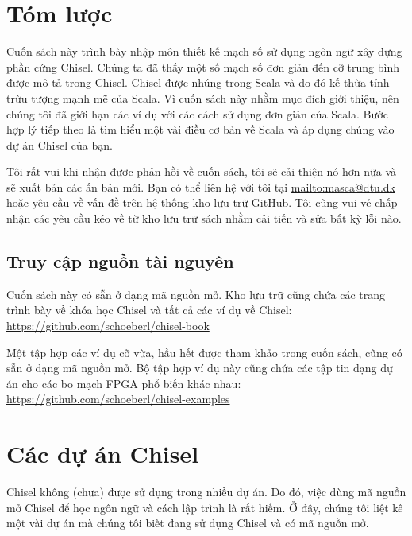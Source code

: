 \documentclass[%
    10pt,
    headinclude, footexclude,
    openright, %
    notitlepage,
    cleardoubleempty,
    headsepline,
    pointlessnumbers,
    bibtotoc, idxtotoc,
    ]{scrbook}
\begin{document}
\chapter{Tóm lược}
\label{sec:conclusion}

Cuốn sách này trình bày nhập môn thiết kế mạch số sử dụng ngôn ngữ xây dựng phần cứng Chisel. Chúng ta đã thấy một số mạch số đơn giản đến cỡ trung bình được mô tả trong Chisel. Chisel được nhúng trong Scala và do đó kế thừa tính trừu tượng mạnh mẽ của Scala. Vì cuốn sách này nhằm mục đích giới thiệu, nên chúng tôi đã giới hạn các ví dụ với các cách sử dụng đơn giản của Scala. Bước hợp lý tiếp theo là tìm hiểu một vài điều cơ bản về Scala và áp dụng chúng vào dự án Chisel của bạn.

Tôi rất vui khi nhận được phản hồi về cuốn sách, tôi sẽ cải thiện nó hơn nữa và sẽ xuất bản các ấn bản mới. Bạn có thể liên hệ với tôi tại \url{mailto:masca@dtu.dk} hoặc yêu cầu về vấn đề trên hệ thống kho lưu trữ GitHub. Tôi cũng vui vẻ chấp nhận các yêu cầu kéo về từ kho lưu trữ sách nhằm cải tiến và sửa bất kỳ lỗi nào. 

\section*{Truy cập nguồn tài nguyên}

Cuốn sách này có sẵn ở dạng mã nguồn mở. Kho lưu trữ cũng chứa các trang trình bày về khóa học Chisel và tất cả các ví dụ về Chisel: \url{https://github.com/schoeberl/chisel-book}

Một tập hợp các ví dụ cỡ vừa, hầu hết được tham khảo trong cuốn sách, cũng có sẵn ở dạng mã nguồn mở. Bộ tập hợp ví dụ này cũng chứa các tập tin dạng dự án cho các bo mạch FPGA phổ biến khác nhau: \url{https://github.com/schoeberl/chisel-examples} 

\appendix

\chapter{Các dự án Chisel}


Chisel không (chưa) được sử dụng trong nhiều dự án. Do đó, việc dùng mã nguồn mở Chisel để học ngôn ngữ và cách lập trình là rất hiếm. Ở đây, chúng tôi liệt kê một vài dự án mà chúng tôi biết đang sử dụng Chisel và có mã nguồn mở. 
\end{document}
